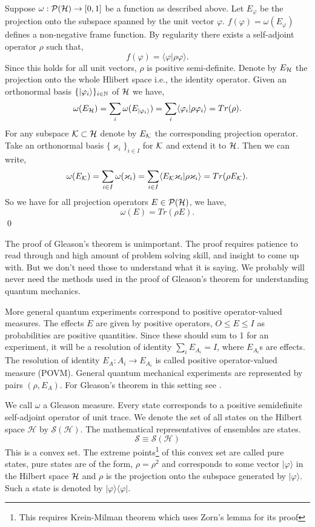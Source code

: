 \documentclass[11pt]{report}
\begin{document}
			Suppose $\omega:\mathcal{P}(\mathcal {H})\to [0,1]$ be a function as described above. Let $E_\varphi$ be the projection onto the subspace spanned by the unit vector $\varphi$. $f(\varphi)=\omega(E_\varphi)$ defines a non-negative frame function. By regularity there exists a self-adjoint operator $\rho$ such that,
			$$f(\varphi)=\langle \varphi |\rho\varphi\rangle.$$
			Since this holds for all unit vectors, $\rho$ is positive semi-definite. Denote by $E_\mathcal {H}$ the projection onto the whole Hlibert space i.e., the identity operator. Given an orthonormal basis $\{|\varphi_i\rangle\}_{i\in\mathbb{N}}$ of $\mathcal {H}$ we have,
			$$\omega (E_\mathcal {H})=\sum_i\omega(E_{|\varphi_i\rangle})=\sum_i \langle \varphi_i|\rho \varphi_i\rangle =Tr(\rho).$$
			For any subspace $\mathcal{K}\subset \mathcal {H}$ denote by $E_{\mathcal{K}}$ the corresponding projection operator. Take an orthonormal basis $\{\varkappa_i\}_{i\in I}$ for $\mathcal{K}$ and extend it to $\mathcal {H}$. Then we can write,
			$$\omega (E_{\mathcal{K}})=\sum_{i\in I} \omega(\varkappa_i)=\sum_{i\in I} \langle E_{\mathcal{K}}\varkappa_i|\rho \varkappa_i\rangle=Tr (\rho E_{\mathcal{K}}).$$
			So we have for all projection operators $E\in \mathcal{P}(\mathcal {H})$, we have,
			$$\omega(E)=Tr(\rho E).$$
			\qed
			\vspace{2em}
			
			\noindent The proof of Gleason's theorem is unimportant. The proof requires patience to read through and high amount of problem solving skill, and insight to come up with. But we don't need those to understand what it is saying. We probably will never need the methods used in the proof of Gleason's theorem for understanding quantum mechanics. 
			
			More general quantum experiments correspond to positive operator-valued measures. The effects $E$ are given by positive operators, $O\leq E\leq I$ as probabilities are positive quantities. Since these should sum to 1 for an experiment, it will be a resolution of identity $\sum_i E_{A_i}=I$, where $E_{A_i}$s are effects. The resolution of identity $E_A:A_i\to E_{A_i}$ is called positive operator-valued measure (POVM). General quantum mechanical experiments are represented by pairs $(\rho, E_A)$. For Gleason's theorem in this setting see \cite{Busch3}. 
			
			We call $\omega$ a Gleason measure. Every state corresponds to a positive semidefinite self-adjoint operator of unit trace. We denote the set of all states on the Hilbert space $\mathcal{H}$ by $\mathcal{S}(\mathcal{H})$. The mathematical representatives of ensembles are states.
			$$\mathcal{S}\equiv \mathcal{S}(\mathcal{H})$$
			This is a convex set. The extreme points\footnote{This requires Krein-Milman theorem which uses Zorn's lemma for its proof} of this convex set are called pure states, pure states are of the form, $\rho=\rho^2$ and corresponds to some vector $|\varphi\rangle$ in the Hilbert space $\mathcal {H}$ and $\rho$ is the projection onto the subspace generated by $|\varphi\rangle$. Such a state is denoted by $|\varphi\rangle\langle \varphi|$.
			
\end{document}
